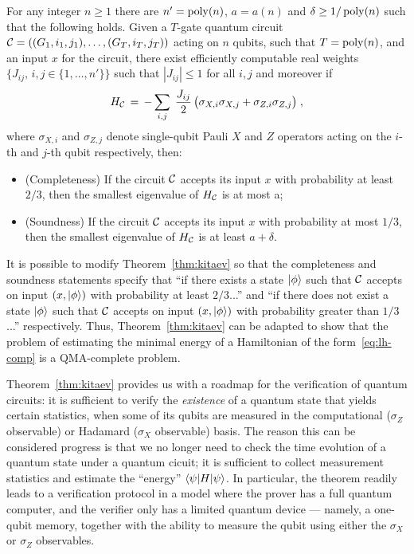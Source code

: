 \begin{theorem}\label{thm:kitaev}
For any integer $n\geq 1$ there are $n'=\operatorname{poly}(n)$, $a=a(n)$ and $\delta \geq 1/\operatorname{poly}(n)$ such that the following holds. 
Given a $T$-gate quantum circuit $\mathcal{C} = ((G_1,i_1,j_1),\ldots,(G_T,i_T,j_T))$ acting on $n$ qubits, such that $T=\operatorname{poly}(n)$, and an input $x$ for the circuit, there exist efficiently computable real weights $\{J_{ij},\, i,j\in\{1,\ldots,n'\}\}$ such that $|J_{ij}|\leq 1$ for all $i,j$ and moreover if
\begin{equation}\label{eq:lh-comp}
H_{\mathcal{C}} \,=\, - \sum_{i,j}\; \frac{J_{ij}}{2}\,\big(\sigma_{X,i} \sigma_{X,j} + \sigma_{Z,i} \sigma_{Z,j}\big)\;,
\end{equation}
where $\sigma_{X,i}$ and $\sigma_{Z,j}$ denote single-qubit Pauli $X$ and $Z$ operators acting on the $i$-th and $j$-th qubit respectively, 
then:
\begin{itemize}
\item (Completeness) If the circuit $\mathcal{C}$ accepts its input $x$ with probability at least $2/3$, then the smallest eigenvalue of $H_{\mathcal{C}}$ is at most a;
\item (Soundness) If the circuit $\mathcal{C}$ accepts its input $x$ with probability at most $1/3$, then the smallest eigenvalue of $H_{\mathcal{C}}$ is at least $a + \delta$.
\end{itemize} 
\end{theorem}

\begin{remark}
It is possible to modify Theorem~\ref{thm:kitaev} so that the completeness and soundness statements specify that ``if there exists a state $|\phi\rangle$ such that $\mathcal{C}$ accepts on input $(x,|\phi\rangle)$ with probability at least $2/3$...'' and ``if there does not exist a state $|\phi\rangle$ such that $\mathcal{C}$ accepts on input $(x,|\phi\rangle)$ with probability greater than $1/3$...'' respectively. Thus, Theorem~\ref{thm:kitaev} can be adapted to show that the problem of estimating the minimal energy of a Hamiltonian of the form~\eqref{eq:lh-comp} is a QMA-complete problem. 
\end{remark}


Theorem~\ref{thm:kitaev} provides us with a roadmap for the verification of quantum circuits: it is sufficient to verify the \emph{existence} of a quantum state that yields certain statistics, when some of its qubits are measured in the computational ($\sigma_Z$ observable) or Hadamard ($\sigma_X$ observable) basis. The reason this can be considered progress is that we no longer need to check the time evolution of a quantum state under a quantum cicuit; it is sufficient to collect measurement statistics and estimate the ``energy'' $\langle\psi|H|\psi\rangle$.  In particular, the theorem readily leads to a verification protocol in a model where the prover has a full quantum computer, and the verifier only has a limited quantum device --- namely, a one-qubit memory, together with the ability to measure the qubit using either the $\sigma_X$ or $\sigma_Z$ observables. 


